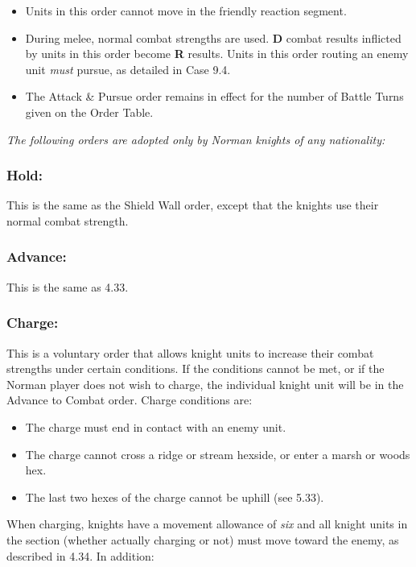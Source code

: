 \begin{itemize}
  \item Units in this order cannot move in the friendly reaction segment.
  \item During melee, normal combat strengths are used. \textbf{D} combat results inflicted by units in this order become \textbf{R} results. Units in this order routing an enemy unit \textit{must} pursue, as detailed in Case 9.4.
  \item The Attack \& Pursue order remains in effect for the number of Battle Turns given on the Order Table.
\end{itemize}

\textit{The following orders are adopted only by Norman knights of any nationality:}

\subsubsection{Hold:} This is the same as the Shield Wall order, except that the knights use their normal combat strength.

\subsubsection{Advance:} This is the same as 4.33.

\subsubsection{Charge:} This is a voluntary order that allows knight units to increase their combat strengths under certain conditions. If the conditions cannot be met, or if the Norman player does not wish to charge, the individual knight unit will be in the Advance to Combat order. Charge conditions are:

\begin{itemize}
  \item The charge must end in contact with an enemy unit.
  \item The charge cannot cross a ridge or stream hexside, or enter a marsh or woods hex.
  \item The last two hexes of the charge cannot be uphill (see 5.33).
\end{itemize}

When charging, knights have a movement allowance of \textit{six} and all knight units in the section (whether actually charging or not) must move toward the enemy, as described in 4.34. In addition:

